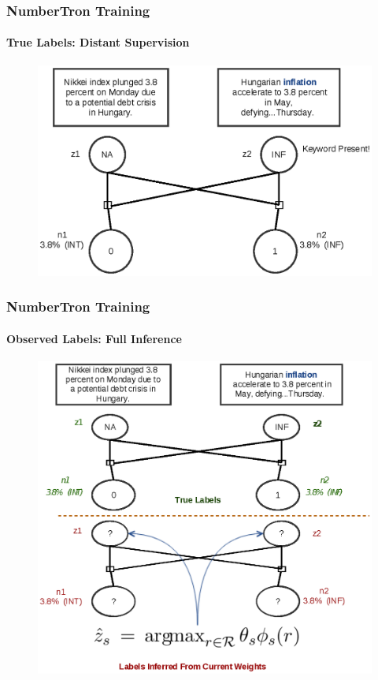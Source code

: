\documentclass{beamer}
\begin{document}
\begin{frame}
\frametitle{NumberTron Training}
\framesubtitle{True Labels: Distant Supervision}
\begin{figure}
\includegraphics[width=\textwidth, height=0.8\textheight]{images/truelabel14.eps}
\end{figure}
\end{frame}


\begin{frame}
\frametitle{NumberTron Training}
\framesubtitle{Observed Labels: Full Inference}
\begin{figure}
\includegraphics[width=\textwidth, height=0.85\textheight]{images/fullinf_1.eps}
\end{figure}
\end{frame}
\end{document}
